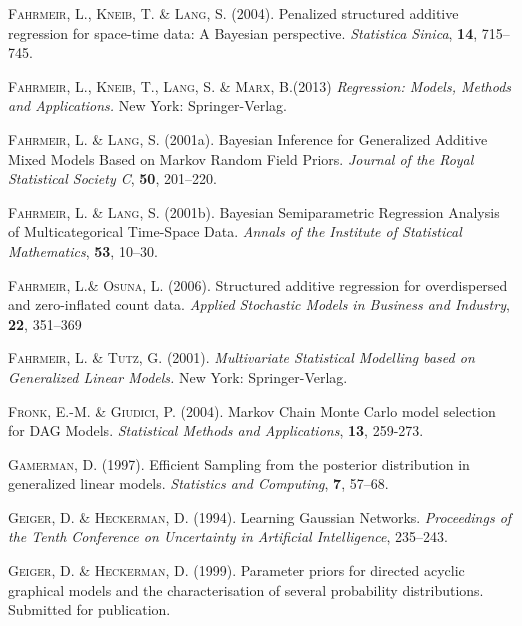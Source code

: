 \begin{thebibliography}{99}
 {\scshape Fahrmeir, L., Kneib, T. \& Lang, S.} (2004).
 Penalized structured additive regression for space-time data: A Bayesian perspective.
 {\it Statistica Sinica}, {\bf 14}, 715--745.

{\scshape Fahrmeir, L.,  Kneib, T., Lang, S. \& Marx, B.}(2013)
{\it Regression: Models, Methods and Applications.}
 New York: Springer-Verlag.


 {\scshape Fahrmeir, L. \& Lang, S.} (2001a).
 Bayesian Inference for Generalized Additive Mixed Models Based on Markov Random Field Priors.
 {\it Journal of the Royal Statistical Society C}, {\bf 50}, 201--220.

 {\scshape Fahrmeir, L. \& Lang, S.} (2001b).
 Bayesian Semiparametric Regression Analysis of Multicategorical Time-Space Data.
 {\it Annals of the Institute of Statistical Mathematics}, {\bf 53}, 10--30.

 {\scshape Fahrmeir, L.\& Osuna, L.} (2006).
 Structured additive regression for overdispersed and zero-inflated count data.
 {\it Applied Stochastic Models in Business and Industry}, {\bf 22}, 351--369

 {\scshape Fahrmeir, L. \& Tutz, G.} (2001).
 {\it Multivariate Statistical Modelling based on Generalized Linear Models.}
 New York: Springer-Verlag.

 {\scshape Fronk, E.-M. \& Giudici, P.} (2004).
 Markov Chain Monte Carlo model selection for DAG Models.
 {\it Statistical Methods and Applications}, {\bf 13}, 259-273.

 {\scshape Gamerman, D.} (1997).
 Efficient Sampling from the posterior distribution in generalized linear models.
 {\it Statistics and Computing}, {\bf 7}, 57--68.

 {\scshape Geiger, D. \& Heckerman, D.} (1994).
 Learning Gaussian Networks.
 {\it Proceedings of the Tenth Conference on Uncertainty in Artificial Intelligence}, 235--243.

 {\scshape Geiger, D. \& Heckerman, D.} (1999).
 Parameter priors for directed acyclic graphical models and the characterisation of several probability distributions.
 Submitted for publication.


\end{thebibliography}
